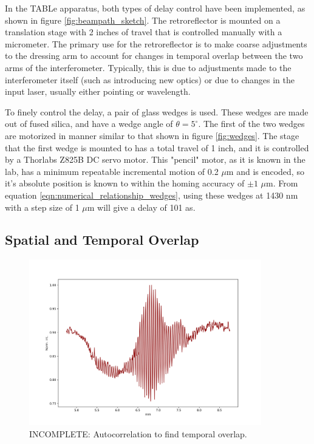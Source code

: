In the TABLe apparatus, both types of delay control have been implemented, as shown in figure \ref{fig:beampath_sketch}.  The retroreflector is mounted on a translation stage with 2 inches of travel that is controlled manually with a micrometer.  The primary use for the retroreflector is to make coarse adjustments to the dressing arm to account for changes in temporal overlap between the two arms of the interferometer.  Typically, this is due to adjustments made to the interferometer itself (such as introducing new optics) or due to changes in the input laser, usually either pointing or wavelength.  

To finely control the delay, a pair of glass wedges is used.  These wedges are made out of fused silica, and have a wedge angle of $\theta=5^\circ$.  The first of the two wedges are motorized in manner similar to that shown in figure \ref{fig:wedges}.  The stage that the first wedge is mounted to has a total travel of 1 inch, and it is controlled by a Thorlabs Z825B DC servo motor.  This "pencil" motor, as it is known in the lab, has a minimum repeatable incremental motion of 0.2 $\mu$m and is encoded, so it's absolute position is known to within the homing accuracy of $\pm1$ $\mu$m.  From equation \ref{eqn:numerical_relationship_wedges}, using these wedges at 1430 nm with a step size of 1 $\mu$m will give a delay of 101 as.

\subsection{Spatial and Temporal Overlap}
\label{sec:temporal_overlap}

\begin{figure}
	\centering
	\includegraphics[width=0.9\textwidth]{figures/Beamline/Overlap_camera.png}
	\caption{INCOMPLETE: Autocorrelation to find temporal overlap.}
	\label{fig:fine_scan_temporal_overlap}
\end{figure}

